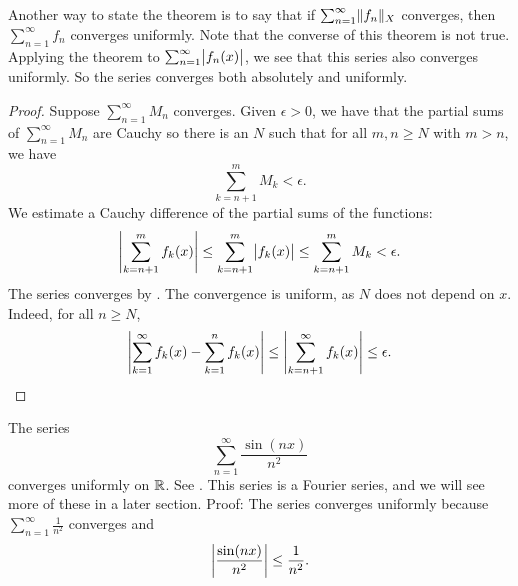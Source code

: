 Another way to state the theorem is to say that if
$\sum_{n=1}^\infty \lVert {f_n} \rVert_X$ converges, then $\sum_{n=1}^\infty f_n$ converges uniformly.
Note that the converse of this theorem is not true.
Applying the theorem to $\sum_{n=1}^\infty \bigl\lvert {f_n(x)} \bigr\rvert$, we
see that this series also converges uniformly.  So the series converges both absolutely
and uniformly.

\begin{proof}
Suppose $\sum_{n=1}^\infty M_n$ converges.  Given $\epsilon > 0$,
we have that the partial sums of $\sum_{n=1}^\infty M_n$ are Cauchy so
there is an $N$ such that for all $m, n \geq N$ with $m > n$, we have
\begin{equation*}
\sum_{k=n+1}^m M_k < \epsilon .
\end{equation*}
We estimate a Cauchy difference of the partial
sums of the functions:
\begin{equation*}
\left\lvert {\sum_{k=n+1}^m f_k(x)} \right\rvert \leq
\sum_{k=n+1}^m \bigl\lvert {f_k(x)} \bigr\rvert \leq
\sum_{k=n+1}^m M_k < \epsilon .
\end{equation*}
The series converges by .
The convergence is uniform, as $N$ does not depend on $x$.
Indeed, for all $n \geq N$,
\begin{equation*}
\left\lvert {\sum_{k=1}^\infty f_k(x) - \sum_{k=1}^n f_k(x)} \right\rvert \leq
\left\lvert {\sum_{k=n+1}^\infty f_k(x)} \right\rvert \leq \epsilon .
\qedhere
\end{equation*}
\end{proof}

\begin{example} \label{example:sinnsqfourier}
The series
\begin{equation*}
\sum_{n=1}^\infty \frac{\sin(nx)}{n^2}
\end{equation*}
converges uniformly on ${\mathbb{R}}$.  See .
This series is a Fourier series, and
we will see more of these in a later section.  Proof:
The series converges uniformly because
$\sum_{n=1}^\infty \frac{1}{n^2}$
converges and
\begin{equation*}
\left\lvert {\frac{\sin(nx)}{n^2}} \right\rvert \leq 
\frac{1}{n^2} .
\end{equation*}
\end{example}

\begin{myfigureht}
\caption{Plot of 
$\sum_{n=1}^\infty \frac{\sin(n x)}{n^2}$ including
the first 8 partial sums in various shades of gray.\label{fig:fouriersern2}}
\end{myfigureht}

